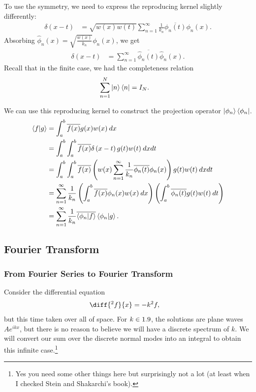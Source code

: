 \documentclass[10pt]{mypackage}
\begin{document}
To use the symmetry, we need to express the reproducing kernel slightly differently:
\begin{align*}
  \delta\left(x-t\right) &= \sqrt{w(x)w(t)}\sum_{n=1}^{\infty}\frac{1}{k_n}\overline{\phi_n(t)}\phi_n(x).
\end{align*}
Absorbing $\widehat{\phi}_n(x) = \sqrt{\frac{w(x)}{k_n}}\phi_n(x)$, we get
\begin{align*}
  \delta\left(x-t\right) &= \sum_{n=1}^{\infty}\overline{\widehat{\phi}_n(t)} \widehat{\phi}_n(x).
\end{align*}
Recall that in the finite case, we had the completeness relation
\begin{align*}
  \sum_{n=1}^{N}\ket{n}\bra{n} &= I_N.
\end{align*}
\begin{example}
We can use this reproducing kernel to construct the projection operator $\ket{\phi_n}\bra{\phi_n}$.
\begin{align*}
  \braket{f}{g} &= \int_{a}^{b} \overline{f(x)}g(x)w(x)\:dx\\
                &= \int_{a}^{b}\int_{a}^{b} \overline{f(x)}\delta\left(x-t\right)g(t)w(t)\:dx dt\\
                &= \int_{a}^{b}\int_{a}^{b} \overline{f(x)} \left(w(x)\sum_{n=1}^{\infty}\frac{1}{k_n}\overline{\phi_n(t)}\phi_n(x)\right) g(t)w(t)\:dx dt\\
                &= \sum_{n=1}^{\infty}\frac{1}{k_n} \left(\int_{a}^{b} \overline{f(x)}\phi_n(x)w(x)\:dx\right)\left(\int_{a}^{b} \overline{\phi_n(t)}g(t)w(t)\:dt\right)\\
                &= \sum_{n=1}^{\infty}\frac{1}{k_n} \overline{\braket{\phi_n}{f}} \braket{\phi_n}{g}.
\end{align*}
\end{example}
\subsection{Fourier Transform}%
\subsubsection{From Fourier Series to Fourier Transform}%
Consider the differential equation
\begin{align*}
  \diff{^2f}{x} &= -k^2 f,
\end{align*}
but this time taken over all of space. For $k\in 1.9$, the solutions are plane waves $A e^{ikx}$, but there is no reason to believe we will have a discrete spectrum of $k$. We will convert our sum over the discrete normal modes into an integral to obtain this infinite case.\footnote{Yes you need some other things here but surprisingly not a lot (at least when I checked Stein and Shakarchi's book).}\newline
\end{document}
